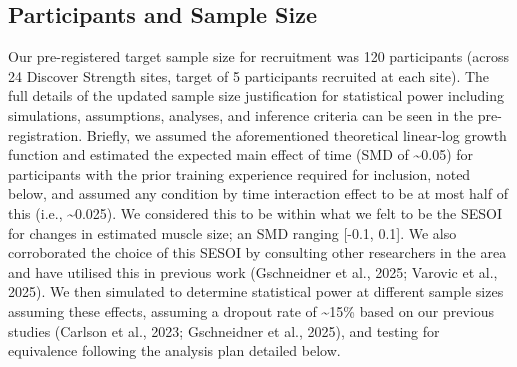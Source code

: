 \documentclass[
]{article}
\begin{document}
\subsection{Participants and Sample
Size}\label{participants-and-sample-size}

Our pre-registered target sample size for recruitment was 120
participants (across 24 Discover Strength sites, target of 5
participants recruited at each site). The full details of the updated
sample size justification for statistical power including simulations,
assumptions, analyses, and inference criteria can be seen in the
pre-registration. Briefly, we assumed the aforementioned theoretical
linear-log growth function and estimated the expected main effect of
time (SMD of \textasciitilde0.05) for participants with the prior
training experience required for inclusion, noted below, and assumed any
condition by time interaction effect to be at most half of this (i.e.,
\textasciitilde0.025). We considered this to be within what we felt to
be the SESOI for changes in estimated muscle size; an SMD ranging
{[}-0.1, 0.1{]}. We also corroborated the choice of this SESOI by
consulting other researchers in the area and have utilised this in
previous work (Gschneidner et al., 2025; Varovic et al., 2025). We then
simulated to determine statistical power at different sample sizes
assuming these effects, assuming a dropout rate of \textasciitilde15\%
based on our previous studies (Carlson et al., 2023; Gschneidner et al.,
2025), and testing for equivalence following the analysis plan detailed
below.
\end{document}
